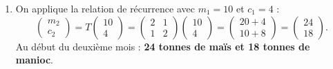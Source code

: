 \documentclass[11pt]{article}
\begin{document}
\begin{corrige}
\begin{enumerate}
\item On applique la relation de récurrence avec $m_1=10$ et $c_1=4$ :
\[ \begin{pmatrix} m_2 \\ c_2 \end{pmatrix}=T\begin{pmatrix} 10 \\ 4 \end{pmatrix}=\begin{pmatrix} 2 & 1 \\ 1 & 2 \end{pmatrix}\begin{pmatrix} 10 \\ 4 \end{pmatrix}=\begin{pmatrix} 20+4 \\ 10+8 \end{pmatrix}=\begin{pmatrix} 24 \\ 18 \end{pmatrix}. \]
Au début du deuxième mois : \textbf{24 tonnes de maïs et 18 tonnes de manioc}.


\end{enumerate}
\end{corrige}
\end{document}

